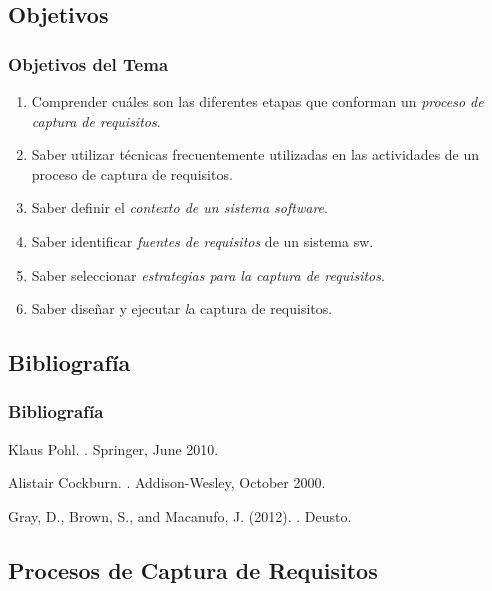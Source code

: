 \documentclass[a4paper,t,xcolor=pst,dvips,blue]{beamer}
\begin{document}
\subsection{Objetivos}

\begin{frame}[c]
    \frametitle{Objetivos del Tema}
    \begin{enumerate}[<+->]
         \item Comprender cuáles son las diferentes etapas que conforman un \emph{proceso de captura de requisitos}.
         \item Saber utilizar técnicas frecuentemente utilizadas en las actividades de un proceso de captura de requisitos.
         \item Saber definir el \emph{contexto de un sistema software}.
         \item Saber identificar \emph{fuentes de requisitos} de un sistema sw.
         \item Saber seleccionar \emph{estrategias para la captura de requisitos}.
         \item Saber diseñar y ejecutar \emph la captura de requisitos.
    \end{enumerate}
\end{frame}

\subsection{Bibliografía}

\begin{frame}[c]
    \frametitle{Bibliografía}
    \begin{thebibliography}{1}

     Klaus Pohl. .
    \newblock Springer, June 2010.

     Alistair Cockburn. .
    \newblock Addison-Wesley, October 2000.

    Gray, D., Brown, S., and Macanufo, J. (2012).
    .
    \newblock Deusto.
\end{thebibliography}
\end{frame}

\subsection{Procesos de Captura de Requisitos}
\end{document}
